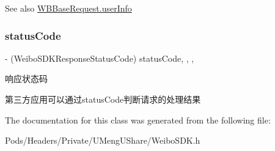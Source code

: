 \begin{DoxySeeAlso}{See also}
\mbox{\hyperlink{interface_w_b_data_transfer_object_ab9b7bf91e1470d29782202c04d1a86fe}{W\+B\+Base\+Request.\+user\+Info}} 
\end{DoxySeeAlso}
\mbox{\label{interface_w_b_base_response_a68f57eeafc84a0b04c4986f2be081c61}} 
\subsubsection{\texorpdfstring{status\+Code}{statusCode}}
{\footnotesize\ttfamily -\/ (Weibo\+S\+D\+K\+Response\+Status\+Code) status\+Code\hspace{0.3cm}{\ttfamily [read]}, {\ttfamily [write]}, {\ttfamily [nonatomic]}, {\ttfamily [assign]}}

响应状态码

第三方应用可以通过status\+Code判断请求的处理结果 

The documentation for this class was generated from the following file\+:\begin{DoxyCompactItemize}
\item 
Pods/\+Headers/\+Private/\+U\+Meng\+U\+Share/Weibo\+S\+D\+K.\+h\end{DoxyCompactItemize}
